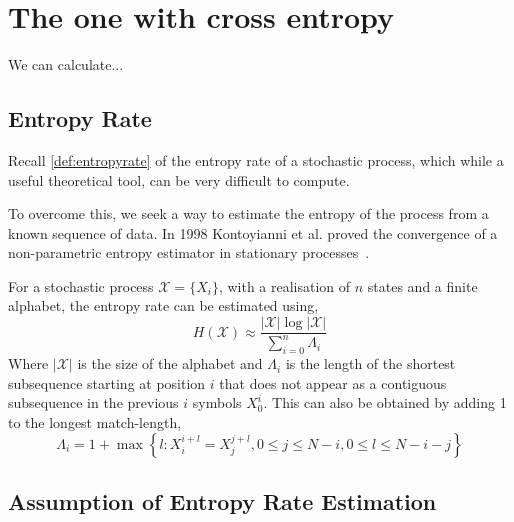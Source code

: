 \chapter{The one with cross entropy \label{ch:crossentropy}}


We can calculate...

\section{Entropy Rate}

Recall \autoref{def:entropyrate} of the entropy rate of a stochastic process, which while a useful theoretical tool, can be very difficult to compute. 

To overcome this, we seek a way to estimate the entropy of the process from a known sequence of data. In 1998 Kontoyianni et al. proved the convergence of a non-parametric entropy estimator in stationary processes~\cite{kontoyiannisNonparametricEntropyEstimation1998}.


\begin{definition}
	For a stochastic process $\mathcal{X} = \{X_i\}$, with a realisation of $n$ states and a finite alphabet,  the entropy rate can be estimated using,
		\begin{equation}\label{eq:estimate}
	H(\mathcal{X}) \approx\frac{|\mathcal{X}| \log |\mathcal{X}| }{\sum_{i=0}^n \Lambda_{i} }
	\end{equation}
	Where $|\mathcal{X}|$ is the size of the alphabet and $\Lambda_{i}$ is the length of the shortest subsequence starting at position $i$ that does not appear as a contiguous subsequence in the previous $i$ symbols $X_{0}^{i}$. This can also be obtained by adding 1 to the longest match-length, 
	 \begin{equation}
	  \Lambda_{i}=1+\max \left\{l: X_{i}^{i+l}=X_{j}^{j+l}, 0 \leq j \leq N-i, 0 \leq l \leq N - i - j \right\}
	 \end{equation}
\end{definition}




\section{Assumption of Entropy Rate Estimation}



